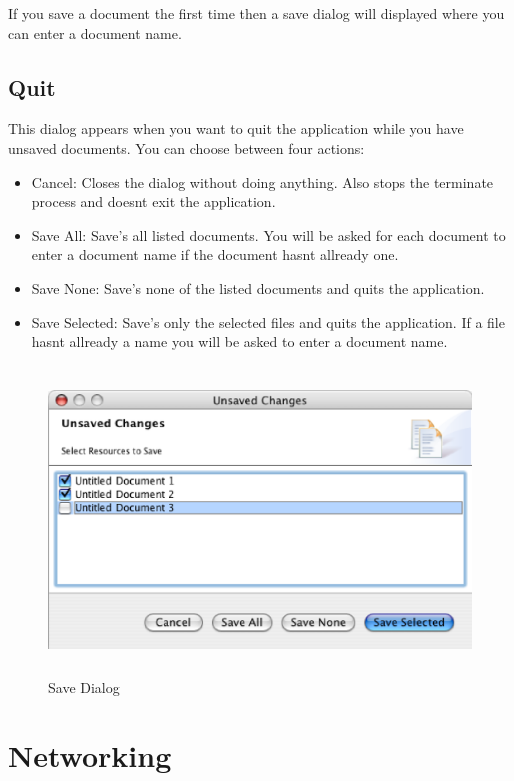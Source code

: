 \documentclass[11pt,a4paper]{article}
\begin{document}
If you save a document the first time then a save dialog will displayed where you can enter a document name.

\subsection{Quit}
This dialog appears when you want to quit the application while you have unsaved documents. You can choose between four actions:
\begin{itemize}
\item Cancel: Closes the dialog without doing anything. Also stops the terminate process and doesnt exit the application.
\item Save All: Save's all listed documents. You will be asked for each document to enter a document name if the document hasnt allready one.
\item Save None: Save's none of the listed documents and quits the application.
\item Save Selected: Save's only the selected files and quits the application. If a file hasnt allready a name you will be asked to enter a document name.
\end{itemize}

\begin{figure}[H]
\begin{center}
  \includegraphics[height=3.20in, width=5.22in]{../images/usermanual/ace_savedialog.eps}
\caption{Save Dialog}
\label{dialog_quit_save}
\end{center}
\end{figure}




\newpage
\section{Networking}
\label{sect_networking}
\end{document}
